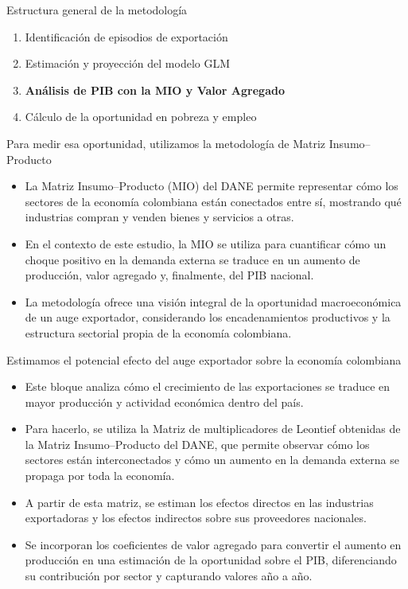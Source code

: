 \documentclass[aspectratio=169,xcolor=dvipsnames]{beamer}
\begin{document}
\begin{frame}{Estructura general de la metodología}
    \begin{enumerate}
        \item \textcolor{gray!70}{Identificación de episodios de exportación}
        \item \textcolor{gray!70}{Estimación y proyección del modelo GLM}
        \item \textbf{Análisis de PIB con la MIO y Valor Agregado}
        \item \textcolor{gray!70}{Cálculo de la oportunidad en pobreza y empleo}
    \end{enumerate}
\end{frame}

\begin{frame}{Para medir esa oportunidad, utilizamos la metodología de Matriz Insumo–Producto}
    \begin{itemize}
        \item La Matriz Insumo–Producto (MIO) del DANE permite representar cómo los sectores de la economía colombiana están conectados entre sí, mostrando qué industrias compran y venden bienes y servicios a otras.
        \item En el contexto de este estudio, la MIO se utiliza para cuantificar cómo un choque positivo en la demanda externa se traduce en un aumento de producción, valor agregado y, finalmente, del PIB nacional.
        \item La metodología ofrece una visión integral de la oportunidad macroeconómica de un auge exportador, considerando los encadenamientos productivos y la estructura sectorial propia de la economía colombiana.
    \end{itemize}
\end{frame}

\begin{frame}{Estimamos el potencial efecto del auge exportador sobre la economía colombiana}
    \begin{itemize}
        \item Este bloque analiza cómo el crecimiento de las exportaciones se traduce en mayor producción y actividad económica dentro del país.
        \item Para hacerlo, se utiliza la Matriz de multiplicadores de Leontief obtenidas de la Matriz Insumo–Producto del DANE, que permite observar cómo los sectores están interconectados y cómo un aumento en la demanda externa se propaga por toda la economía.
        \item A partir de esta matriz, se estiman los efectos directos en las industrias exportadoras y los efectos indirectos sobre sus proveedores nacionales.
        \item Se incorporan los coeficientes de valor agregado para convertir el aumento en producción en una estimación de la oportunidad sobre el PIB, diferenciando su contribución por sector y capturando valores año a año.
    \end{itemize}
\end{frame}
\end{document}
